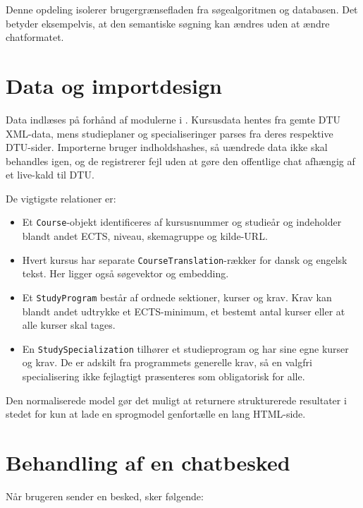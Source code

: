 \documentclass[11pt,a4paper]{article}
\newcommand{\code}[1]{\texttt{#1}}
\begin{document}
Denne opdeling isolerer brugergrænsefladen fra søgealgoritmen og databasen.
Det betyder eksempelvis, at den semantiske søgning kan ændres uden at ændre
chatformatet.

\section{Data og importdesign}

Data indlæses på forhånd af modulerne i . Kursusdata hentes
fra gemte DTU XML-data, mens studieplaner og specialiseringer parses fra deres
respektive DTU-sider. Importerne bruger indholdshashes, så uændrede data ikke
skal behandles igen, og de registrerer fejl uden at gøre den offentlige chat
afhængig af et live-kald til DTU.

De vigtigste relationer er:

\begin{itemize}
  \item Et \code{Course}-objekt identificeres af kursusnummer og studieår og
  indeholder blandt andet ECTS, niveau, skemagruppe og kilde-URL.
  \item Hvert kursus har separate \code{CourseTranslation}-rækker for dansk
  og engelsk tekst. Her ligger også søgevektor og embedding.
  \item Et \code{StudyProgram} består af ordnede sektioner, kurser og krav.
  Krav kan blandt andet udtrykke et ECTS-minimum, et bestemt antal kurser
  eller at alle kurser skal tages.
  \item En \code{StudySpecialization} tilhører et studieprogram og har sine
  egne kurser og krav. De er adskilt fra programmets generelle krav, så en
  valgfri specialisering ikke fejlagtigt præsenteres som obligatorisk for alle.
\end{itemize}

Den normaliserede model gør det muligt at returnere strukturerede resultater
i stedet for kun at lade en sprogmodel genfortælle en lang HTML-side.

\section{Behandling af en chatbesked}

Når brugeren sender en besked, sker følgende:
\end{document}
